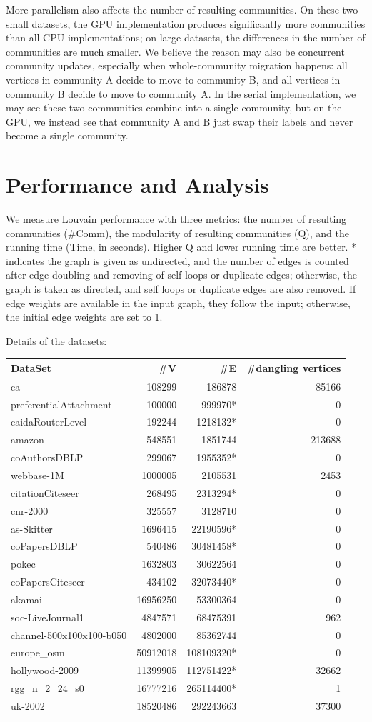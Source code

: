 \documentclass[10pt,oneside]{memoir}
\begin{document}
More parallelism also affects the number of resulting communities. On
these two small datasets, the GPU implementation produces significantly
more communities than all CPU implementations; on large datasets, the
differences in the number of communities are much smaller. We believe
the reason may also be concurrent community updates, especially when
whole-community migration happens: all vertices in community A decide to
move to community B, and all vertices in community B decide to move to
community A. In the serial implementation, we may see these two
communities combine into a single community, but on the GPU, we instead
see that community A and B just swap their labels and never become a
single community.

\hypertarget{performance-and-analysis-4}{%
\section{Performance and Analysis}\label{performance-and-analysis-4}}

We measure Louvain performance with three metrics: the number of
resulting communities (\#Comm), the modularity of resulting communities
(Q), and the running time (Time, in seconds). Higher Q and lower running
time are better. * indicates the graph is given as undirected, and the
number of edges is counted after edge doubling and removing of self
loops or duplicate edges; otherwise, the graph is taken as directed, and
self loops or duplicate edges are also removed. If edge weights are
available in the input graph, they follow the input; otherwise, the
initial edge weights are set to 1.

Details of the datasets:

\begin{longtable}[]{@{}lrrr@{}}
\toprule
DataSet & \#V & \#E & \#dangling vertices\tabularnewline
\midrule
\endhead
ca & 108299 & 186878 & 85166\tabularnewline
preferentialAttachment & 100000 & 999970* & 0\tabularnewline
caidaRouterLevel & 192244 & 1218132* & 0\tabularnewline
amazon & 548551 & 1851744 & 213688\tabularnewline
coAuthorsDBLP & 299067 & 1955352* & 0\tabularnewline
webbase-1M & 1000005 & 2105531 & 2453\tabularnewline
citationCiteseer & 268495 & 2313294* & 0\tabularnewline
cnr-2000 & 325557 & 3128710 & 0\tabularnewline
as-Skitter & 1696415 & 22190596* & 0\tabularnewline
coPapersDBLP & 540486 & 30481458* & 0\tabularnewline
pokec & 1632803 & 30622564 & 0\tabularnewline
coPapersCiteseer & 434102 & 32073440* & 0\tabularnewline
akamai & 16956250 & 53300364 & 0\tabularnewline
soc-LiveJournal1 & 4847571 & 68475391 & 962\tabularnewline
channel-500x100x100-b050 & 4802000 & 85362744 & 0\tabularnewline
europe\_osm & 50912018 & 108109320* & 0\tabularnewline
hollywood-2009 & 11399905 & 112751422* & 32662\tabularnewline
rgg\_n\_2\_24\_s0 & 16777216 & 265114400* & 1\tabularnewline
uk-2002 & 18520486 & 292243663 & 37300\tabularnewline
\bottomrule
\end{longtable}
\end{document}
